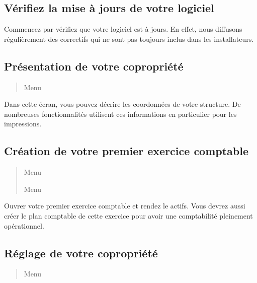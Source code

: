 \documentclass[a4paper,10pt,oneside,french]{sphinxmanual}
\begin{document}
\subsection{Vérifiez la mise à jours de votre logiciel}
\label{\detokenize{syndic/first_step:verifiez-la-mise-a-jours-de-votre-logiciel}}
Commencez par vérifiez que votre logiciel est à jours.
En effet, nous diffusons régulièrement des correctifs qui ne sont pas toujours inclus dans les installateurs.


\subsection{Présentation de votre copropriété}
\label{\detokenize{syndic/first_step:presentation-de-votre-copropriete}}\begin{quote}

Menu 
\end{quote}

Dans cette écran, vous pouvez décrire les coordonnées de votre structure.
De nombreuses fonctionnalités utilisent ces informations en particulier pour les impressions.


\subsection{Création de votre premier exercice comptable}
\label{\detokenize{syndic/first_step:creation-de-votre-premier-exercice-comptable}}\begin{quote}

Menu 

Menu 
\end{quote}

Ouvrer votre premier exercice comptable et rendez le actifs.
Vous devrez aussi créer le plan comptable de cette exercice pour avoir une comptabilité pleinement opérationnel.


\subsection{Réglage de votre copropriété}
\label{\detokenize{syndic/first_step:reglage-de-votre-copropriete}}\begin{quote}

Menu 
\end{quote}
\end{document}
